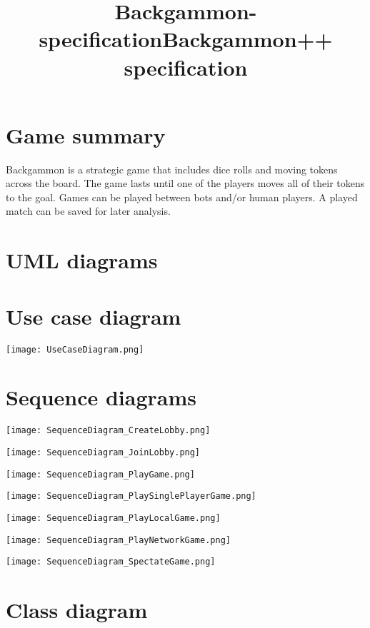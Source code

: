 \documentclass{article}
\title{Backgammon-specification}
\title{Backgammon++ specification}
\begin{document}
\maketitle

\section{Game summary}

Backgammon is a strategic game that includes dice rolls and moving tokens across the board.
The game lasts until one of the players moves all of their tokens to the goal. Games can be
played between bots and/or human players. A played match can be saved for later analysis.

\section{UML diagrams}

\section{Use case diagram}

\texttt{[image: UseCaseDiagram.png]}
\clearpage

\section{Sequence diagrams}

\texttt{[image: SequenceDiagram\_CreateLobby.png]}
\clearpage

\texttt{[image: SequenceDiagram\_JoinLobby.png]}
\clearpage

\texttt{[image: SequenceDiagram\_PlayGame.png]}
\clearpage

\texttt{[image: SequenceDiagram\_PlaySinglePlayerGame.png]}
\clearpage

\texttt{[image: SequenceDiagram\_PlayLocalGame.png]}
\clearpage

\texttt{[image: SequenceDiagram\_PlayNetworkGame.png]}
\clearpage

\texttt{[image: SequenceDiagram\_SpectateGame.png]}
\clearpage

\section{Class diagram}
\noindent{}
\end{document}
